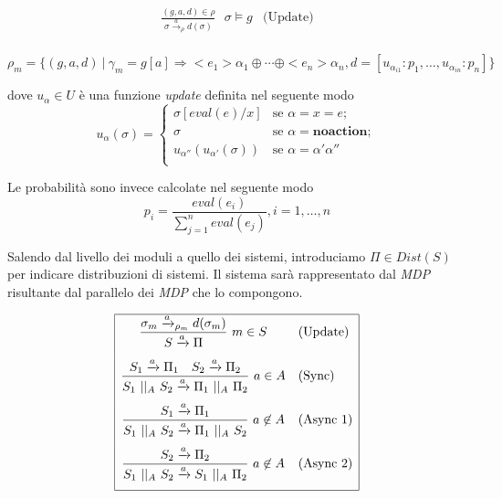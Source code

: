\documentclass{article}
\newcommand{\Space}{\mbox{ }}
\newcommand{\Par}{\Space||_A\Space}
\begin{document}
$$
\begin{array}{cl}
	\displaystyle{\frac{(g,a,d) \in \rho}{\sigma \xrightarrow{a}_\rho d(\sigma)} \Space \sigma \models g} & \mbox{(Update)} \\
\end{array}
$$

$$
\rho_m = \{(g,a,d)\ |\ \gamma_m = g[a] \Rightarrow <e_1> \alpha_1 \oplus \cdots \oplus <e_n> \alpha_n, d=[u_{\alpha_{i 1}}:p_1, \dots, u_{\alpha_{i n}}:p_n]\}
$$

dove $u_\alpha \in U$ è una funzione \emph{update} definita nel seguente modo
$$ 
u_{\alpha}(\sigma) = \left\{
\begin{array}{ll}
	\sigma[eval(e)/x]	& \mbox{se } \alpha = x = e; \\
	\sigma				& \mbox{se } \alpha = \mathbf{noaction}; \\
	u_{\alpha''}(u_{\alpha'}(\sigma))	& \mbox{se } \alpha = \alpha' \alpha'' \\
\end{array}
\right.
$$

Le probabilità sono invece calcolate nel seguente modo
$$ p_i = \frac{eval(e_i)}{\sum_{j=1}^{n}eval(e_j)},i=1,\dots,n $$

Salendo dal livello dei moduli a quello dei sistemi, introduciamo $\Pi \in Dist(S) $ per indicare distribuzioni di sistemi. Il sistema sarà rappresentato dal \emph{MDP} risultante dal parallelo dei \emph{MDP} che lo compongono.

$$
\begin{array}{|cl|}
	\hline
	\displaystyle{\frac{\sigma_m \xrightarrow{a}_{\rho_m} d(\sigma_m)}{S \xrightarrow{a} \Pi}\ m \in S} & \mbox{(Update)} \\[.5cm]
	\displaystyle{\frac{S_1 \xrightarrow{a} \Pi_1 \quad S_2 \xrightarrow{a} \Pi_2}{S_1 \Par S_2 \xrightarrow{a} \Pi_1 \Par \Pi_2}\ a \in A} & \mbox{(Sync)} \\[.5cm]
	\displaystyle{\frac{S_1 \xrightarrow{a} \Pi_1}{S_1 \Par S_2 \xrightarrow{a} \Pi_1 \Par S_2}\ a \not\in A} & \mbox{(Async\ 1)} \\[.5cm]
	\displaystyle{\frac{S_2 \xrightarrow{a} \Pi_2}{S_1 \Par S_2 \xrightarrow{a} S_1 \Par \Pi_2}\ a \not\in A} & \mbox{(Async\ 2)} \\[.5cm]
	\hline
\end{array}
$$
\end{document}
